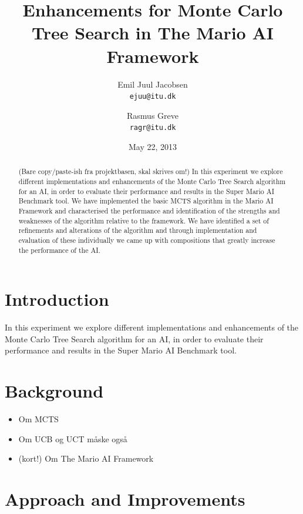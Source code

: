 \documentclass[10pt,a4paper]{article}
\begin{document}
\title{Enhancements for Monte Carlo Tree Search in The Mario AI Framework}
\date{May 22, 2013}
\author{Emil Juul Jacobsen\\\texttt{ejuu@itu.dk}        
        \and Rasmus Greve\\\texttt{ragr@itu.dk}}
\maketitle
\thispagestyle{empty} %
\begin{abstract}
(Bare copy/paste-ish fra projektbasen, skal skrives om!)
In this experiment we explore different implementations and enhancements of the Monte Carlo Tree Search algorithm for an AI, in order to evaluate their performance and results in the Super Mario AI Benchmark tool. 
We have implemented the basic MCTS algorithm in the Mario AI 
Framework and characterised the performance and identification of 
the strengths and weaknesses of the algorithm relative to the 
framework. We have identified a set of refinements and alterations of the algorithm 
and through implementation and evaluation of these individually we came up
with compositions that greatly increase the performance of the AI.
\end{abstract}
\clearpage

\section{Introduction}
In this experiment we explore different implementations and enhancements of the Monte Carlo Tree Search algorithm for an AI, in order to evaluate their performance and results in the Super Mario AI Benchmark tool. 
\clearpage

\section{Background}
\begin{itemize}
\item Om MCTS \cite{mctssurvey}
\item Om UCB og UCT \cite{mctssurvey} måske også \cite{mspacman}
\item (kort!) Om The Mario AI Framework  \cite{mario}
\end{itemize}
\clearpage

\section{Approach and Improvements}
\end{document}
